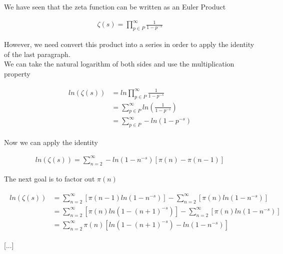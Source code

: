 \documentclass{article}
\begin{document}
We have seen that the zeta function can be written as an Euler Product

\begin{align*}
    \zeta (s)=\prod_{p\in P}^{\infty}\frac{1}{1-p^{-s}}
\end{align*}

However, we need convert this product into a series in order to apply the identity of the last paragraph.
\\
We can take the natural logarithm of both sides and use the multiplication property

\begin{align*}
    \begin{split}
        ln\left(\zeta (s)\right)&=ln\prod_{p\in P}^{\infty}\frac{1}{1-p^{-s}}
        \\
        &=\sum_{p\in P}^{\infty}ln\left(\frac{1}{1-p^{-s}}\right)
        \\
        &=\sum_{p\in P}^{\infty}-ln\left(1-p^{-s}\right)
    \end{split}
\end{align*}

Now we can apply the identity

\begin{align*}
    ln\left(\zeta (s)\right)=\sum_{n=2}^{\infty}-ln\left(1-n^{-s}\right)\left[\pi (n) - \pi (n-1)\right]
\end{align*}

The next goal is to factor out $\pi (n)$

\begin{align*}
    \begin{split}
        ln\left(\zeta (s)\right)&=\sum_{n=2}^{\infty}\left[\pi (n-1)ln\left(1-n^{-s}\right)\right]
        -\sum_{n=2}^{\infty}\left[\pi (n)ln\left(1-n^{-s}\right)\right]
        \\&=\sum_{n=2}^{\infty}\left[\pi (n)ln\left(1-(n+1)^{-s}\right)\right]
        -\sum_{n=2}^{\infty}\left[\pi (n)ln\left(1-n^{-s}\right)\right]
        \\
        &=\sum_{n=2}^{\infty}\pi (n)\left[ln\left(1-(n+1)^{-s}\right)-ln\left(1-n^{-s}\right)\right]
    \end{split}
\end{align*}

[...]
\end{document}
